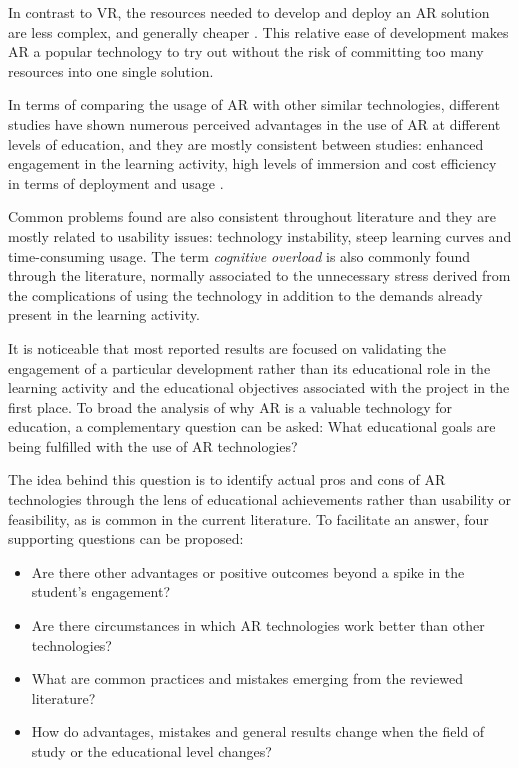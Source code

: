 In contrast to \ac{VR}, the resources needed to develop and deploy an \ac{AR} solution are less complex, and generally cheaper \parencite{ivanova_2018}. This relative ease of development makes \ac{AR} a popular technology to try out without the risk of committing too many resources into one single solution.

In terms of comparing the usage of \ac{AR} with other similar technologies, different studies have shown numerous perceived advantages in the use of \ac{AR} at different levels of education, and they are mostly consistent between studies: enhanced engagement in the learning activity, high levels of immersion and cost
efficiency in terms of deployment and usage \parencite{challenor_2019,chen_2017,saidin_2015}.

Common problems found are also consistent throughout literature and they are mostly related to usability issues: technology instability, steep learning curves and time-consuming usage. The term \emph{cognitive overload} is also commonly found through the literature, normally associated to the unnecessary stress derived
from the complications of using the technology in addition to the demands already present in the learning activity.

It is noticeable that most reported results are focused on validating the engagement of a particular development rather than its educational role in the learning activity and the educational objectives associated with the project in the first place. To broad the analysis of why \ac{AR} is a valuable technology for
education, a complementary question can be asked: What educational goals are being fulfilled with the use of \ac{AR} technologies?

The idea behind this question is to identify actual pros and cons of \ac{AR} technologies through the lens of educational achievements rather than usability or feasibility, as is common in the current literature. To facilitate an answer, four supporting questions can be proposed:

\begin{itemize}
    \item Are there other advantages or positive outcomes beyond a spike in the student's engagement?
    \item Are there circumstances in which \ac{AR} technologies work better than other technologies? 
    \item What are common practices and mistakes emerging from the reviewed literature?
    \item How do advantages, mistakes and general results change when the field of study or the educational level changes?
\end{itemize}

